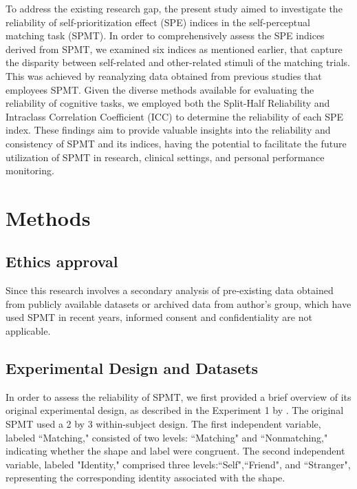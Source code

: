 \documentclass[sn-apa]{sn-jnl}%
\theoremstyle{thmstyleone}%
\theoremstyle{thmstyletwo}%
\theoremstyle{thmstylethree}%
\begin{document}
To address the existing research gap, the present study aimed to investigate the reliability of self-prioritization effect (SPE) indices in the self-perceptual matching task (SPMT). In order to comprehensively assess the SPE indices derived from SPMT, we examined six indices as mentioned earlier, that capture the disparity between self-related and other-related stimuli of the matching trials. This was achieved by reanalyzing data obtained from previous studies that employees SPMT. Given the diverse methods available for evaluating the reliability of cognitive tasks, we employed both the Split-Half Reliability and Intraclass Correlation Coefficient (ICC) to determine the reliability of each SPE index. These findings aim to provide valuable insights into the reliability and consistency of SPMT and its indices, having the potential to facilitate the future utilization of SPMT in research, clinical settings, and personal performance monitoring.


\section{Methods}\label{sec:method}

\subsection{Ethics approval}\label{subsec:ethics}

Since this research involves a secondary analysis of pre-existing data obtained from publicly available datasets or archived data from author’s group, which have used SPMT in recent years, informed consent and confidentiality are not applicable. 

\subsection{Experimental Design and Datasets}\label{subsec:experiment}
 
In order to assess the reliability of SPMT, we first provided a brief overview of its original experimental design, as described in the Experiment 1 by \textcite{sui2012perceptual}. The original SPMT used a 2 by 3 within-subject design. The first independent variable, labeled ``Matching," consisted of two levels: ``Matching" and ``Nonmatching," indicating whether the shape and label were congruent. The second independent variable, labeled "Identity," comprised three levels:``Self",``Friend", and ``Stranger", representing the corresponding identity associated with the shape.
\end{document}
